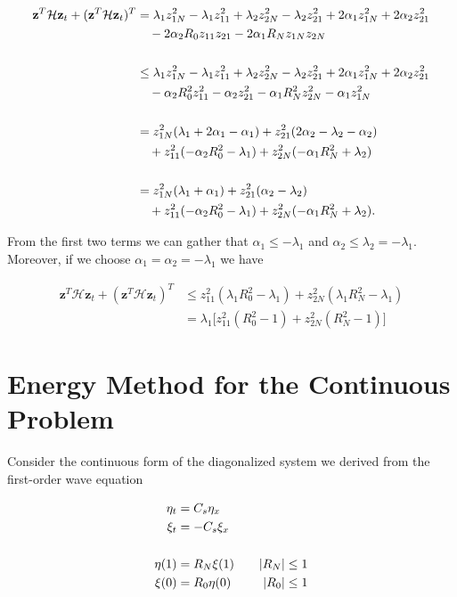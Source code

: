 \documentclass[12pt]{article}
\begin{document}
\begin{flushleft}
\begin{align*}
\mathbf{z}^{T} \mathcal{H} \mathbf{z}_t + (\mathbf{z}^{T}\mathcal{H} \mathbf{z}_t)^{T} &=  \lambda_1 z_{1N}^2 - \lambda_1 z_{11}^2 + \lambda_2 z_{2N}^2 - \lambda_2 z_{21}^2 
+ 2\alpha_1 z_{1N}^2 + 2 \alpha_2 z_{21}^2\\
& \quad - 2\alpha_2 R_0 z_{11}z_{21} - 2\alpha_1 R_N z_{1N}z_{2N}\\
\vspace{0.25cm}\\
&\leq \lambda_1 z_{1N}^2 - \lambda_1 z_{11}^2 + \lambda_2 z_{2N}^2 - \lambda_2 z_{21}^2 
+ 2\alpha_1 z_{1N}^2 + 2 \alpha_2 z_{21}^2\\
& \quad -\alpha_2 R_0^2 z_{11}^2 -  \alpha_2 z_{21}^2 -\alpha_1 R_N^2 z_{2N}^2 -\alpha_1  z_{1N}^2\\
\vspace{0.25cm}\\
&= z_{1N}^2 ( \lambda_1 + 2\alpha_1 - \alpha_1) + z_{21}^2(2\alpha_2 -\lambda_2 -\alpha_2)\\
& \quad +z_{11}^2(-\alpha_2 R_0^2 - \lambda_1) + z_{2N}^2(-\alpha_1 R_N^2 + \lambda_2)\\
\vspace{0.25cm}\\
&= z_{1N}^2 ( \lambda_1 + \alpha_1) + z_{21}^2(\alpha_2 -\lambda_2 )\\
& \quad +z_{11}^2(-\alpha_2 R_0^2 - \lambda_1) + z_{2N}^2(-\alpha_1 R_N^2 + \lambda_2).
\end{align*}

From the first two terms we can gather that $\alpha_1 \leq -\lambda_1$ and $\alpha_2 \leq \lambda_2 = -\lambda_1$. Moreover, if we choose $\alpha_1 = \alpha_2 = -\lambda_1$ we have

\begin{align*}
\mathbf{z}^{T} \mathcal{H} \mathbf{z}_t + (\mathbf{z}^{T}\mathcal{H} \mathbf{z}_t)^{T} &\leq z_{11}^2 ( \lambda_1 R_0^2 - \lambda_1) + z_{2N}^2(\lambda_1 R_N^2 - \lambda_1)\\
&= \lambda_1 \big [ z_{11}^2(R_0^2 - 1) + z_{2N}^2( R_N^2 - 1) \big ]
\end{align*}

\section*{Energy Method for the Continuous Problem}
Consider the continuous form of the diagonalized system we derived from the first-order wave equation 

\begin{align*}
\eta_t &= C_s \eta_x  \\
\xi_t &= -C_s \xi_x\\
\vspace{0.25cm}\\
\eta(1) &= R_N \xi(1) \quad &|R_N| \leq 1 \\
\xi(0) &= R_0 \eta(0) \quad &|R_0| \leq 1 \\
\end{align*}


\end{flushleft}
\end{document}
